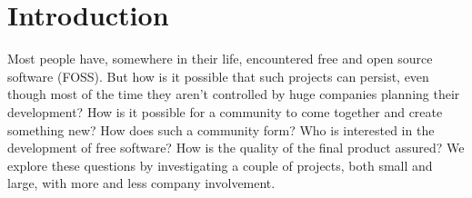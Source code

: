\section{Introduction}
Most people have, somewhere in their life, encountered free and open source software (FOSS). But how is it possible that such projects can persist, even though most of the time they aren't controlled by huge companies planning their development? How is it possible for a community to come together and create something new? How does such a community form? Who is interested in the development of free software? How is the quality of the final product assured? We explore these questions by investigating a couple of projects, both small and large, with more and less company involvement.

